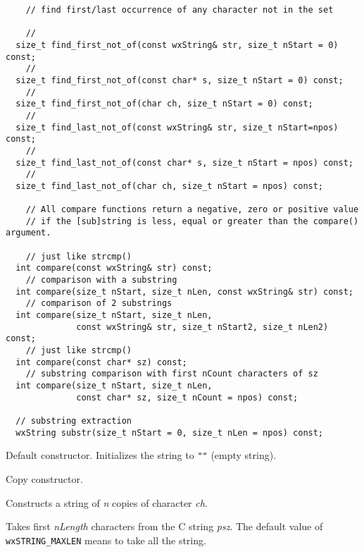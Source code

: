 \begin{verbatim}
    // find first/last occurrence of any character not in the set

    //
  size_t find_first_not_of(const wxString& str, size_t nStart = 0) const;
    //
  size_t find_first_not_of(const char* s, size_t nStart = 0) const;
    //
  size_t find_first_not_of(char ch, size_t nStart = 0) const;
    //
  size_t find_last_not_of(const wxString& str, size_t nStart=npos) const;
    //
  size_t find_last_not_of(const char* s, size_t nStart = npos) const;
    //
  size_t find_last_not_of(char ch, size_t nStart = npos) const;

    // All compare functions return a negative, zero or positive value
    // if the [sub]string is less, equal or greater than the compare() argument.

    // just like strcmp()
  int compare(const wxString& str) const;
    // comparison with a substring
  int compare(size_t nStart, size_t nLen, const wxString& str) const;
    // comparison of 2 substrings
  int compare(size_t nStart, size_t nLen,
              const wxString& str, size_t nStart2, size_t nLen2) const;
    // just like strcmp()
  int compare(const char* sz) const;
    // substring comparison with first nCount characters of sz
  int compare(size_t nStart, size_t nLen,
              const char* sz, size_t nCount = npos) const;

  // substring extraction
  wxString substr(size_t nStart = 0, size_t nLen = npos) const;
\end{verbatim}



\label{wxstringconstruct}


Default constructor. Initializes the string to {\tt ""} (empty string).


Copy constructor.


Constructs a string of {\it n} copies of character {\it ch}.


Takes first {\it nLength} characters from the C string {\it psz}.
The default value of {\tt wxSTRING\_MAXLEN} means to take all the string.

